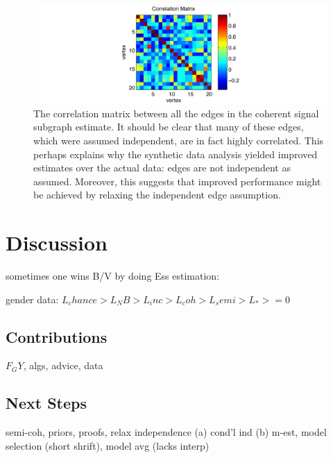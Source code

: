 \documentclass[10pt,journal,cspaper,compsoc]{IEEEtran}
\begin{document}
\clearpage
\begin{figure}[htbp]
	\centering
		\includegraphics[width=1.0\linewidth]{../figs/cov_BLSA0317_rates_rates.pdf}
	\caption{The correlation matrix between all the edges in the coherent signal subgraph estimate. It should be clear that many of these edges, which were assumed independent, are in fact highly correlated.  This perhaps explains why the synthetic data analysis yielded improved estimates over the actual data: edges are not independent as assumed.  Moreover, this suggests that improved performance might be achieved by relaxing the independent edge assumption.}
	\label{fig:cov}
\end{figure}






\section{Discussion} %
\label{sec:discussion}

sometimes one wins B/V by doing Ess estimation:

gender data: $L_chance > L_NB > L_inc > L_coh > L_semi > L_* >= 0$


\subsection{Contributions} %
\label{sub:contributions}

$F_GY$, algs, advice, data



\subsection{Next Steps} %
\label{sub:next_steps}

semi-coh, priors, proofs, relax independence (a) cond'l ind (b) m-est, model selection (short shrift), model avg (lacks interp)
\end{document}

